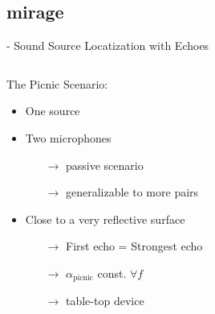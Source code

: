 \subsection{mirage}

\begin{frame}{\mirage - Sound Source Locatization with Echoes}

    \vspace*{5mm}
    \begin{columns}

        \begin{column}{0.5\textwidth}
            \begin{block}{The \alert{Picnic} Scenario:}
                \begin{itemize}
                    \small
                    \item One source
                    \item Two microphones
                    \begin{itemize}
                        \item[$\rightarrow$] passive scenario
                        \item[$\rightarrow$] generalizable to more pairs
                    \end{itemize}
                    \item Close to a very reflective surface
                    \begin{itemize}
                        \item[$\rightarrow$] First echo = Strongest echo
                        \item[$\rightarrow$] $\alpha_\text{picnic}$ const. $\forall f$
                        \item[$\rightarrow$] table-top device
                    \end{itemize}
                \end{itemize}
            \end{block}
        \end{column}

        \begin{column}{0.5\textwidth}
            \centering
        \end{column}
    \end{columns}


\end{frame}
